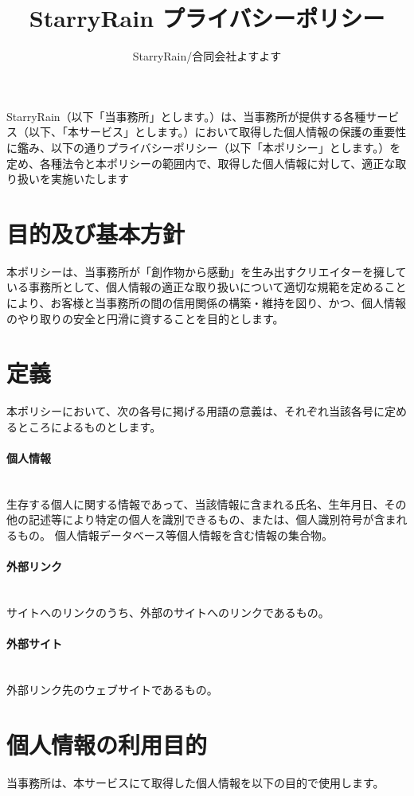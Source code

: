 \documentclass[a4j,titlepage]{ltjsarticle}
\title{StarryRain プライバシーポリシー}
\author{StarryRain/合同会社よすよす}
\begin{document}
\maketitle

\tableofcontents
\clearpage

StarryRain（以下「当事務所」とします。）は、当事務所が提供する各種サービス（以下、「本サービス」とします。）において取得した個人情報の保護の重要性に鑑み、以下の通りプライバシーポリシー（以下「本ポリシー」とします。）を定め、各種法令と本ポリシーの範囲内で、取得した個人情報に対して、適正な取り扱いを実施いたします
\renewcommand{\thesection}{第\arabic{section}条}
\section{目的及び基本方針}
本ポリシーは、当事務所が「創作物から感動」を生み出すクリエイターを擁している事務所として、個人情報の適正な取り扱いについて適切な規範を定めることにより、お客様と当事務所の間の信用関係の構築・維持を図り、かつ、個人情報のやり取りの安全と円滑に資することを目的とします。

\section{定義}
本ポリシーにおいて、次の各号に掲げる用語の意義は、それぞれ当該各号に定めるところによるものとします。
\paragraph{個人情報}\mbox{}\\
生存する個人に関する情報であって、当該情報に含まれる氏名、生年月日、その他の記述等により特定の個人を識別できるもの、または、個人識別符号が含まれるもの。
個人情報データベース等個人情報を含む情報の集合物。
\paragraph{外部リンク}\mbox{}\\
サイトへのリンクのうち、外部のサイトへのリンクであるもの。
\paragraph{外部サイト}\mbox{}\\
外部リンク先のウェブサイトであるもの。

\section{個人情報の利用目的}
当事務所は、本サービスにて取得した個人情報を以下の目的で使用します。
\end{document}
